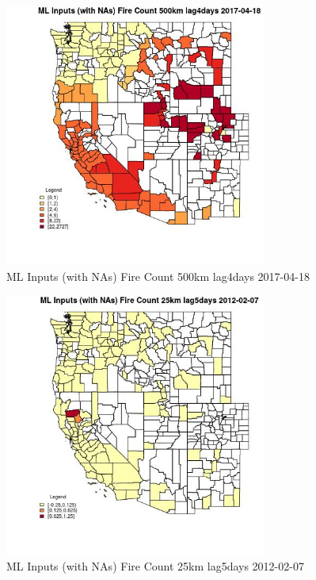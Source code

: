 \begin{figure} 
\centering  
\includegraphics[width=0.77\textwidth]{Code_Outputs/Report_ML_input_PM25_Step4_part_f_de_duplicated_aveswNAs_CountyFire_Count_500km_lag4daysMean2017-04-18.jpg} 
\caption{\label{fig:Report_ML_input_PM25_Step4_part_f_de_duplicated_aveswNAsCountyFire_Count_500km_lag4daysMean2017-04-18}ML Inputs (with NAs) Fire Count 500km lag4days 2017-04-18} 
\end{figure} 
 

\clearpage 

\begin{figure} 
\centering  
\includegraphics[width=0.77\textwidth]{Code_Outputs/Report_ML_input_PM25_Step4_part_f_de_duplicated_aveswNAs_CountyFire_Count_25km_lag5daysMean2012-02-07.jpg} 
\caption{\label{fig:Report_ML_input_PM25_Step4_part_f_de_duplicated_aveswNAsCountyFire_Count_25km_lag5daysMean2012-02-07}ML Inputs (with NAs) Fire Count 25km lag5days 2012-02-07} 
\end{figure} 
 

